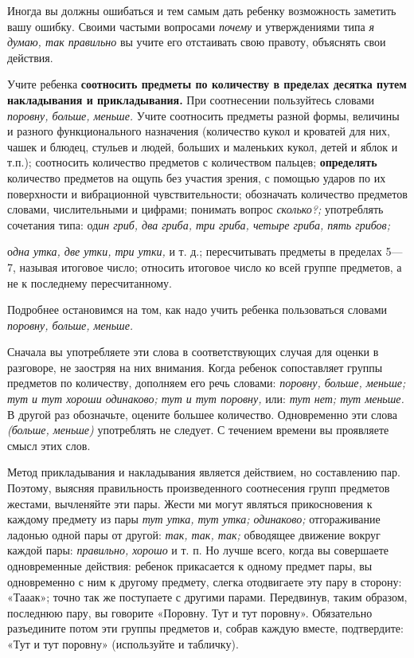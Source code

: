 \documentclass[a5paper]{book}
\renewcommand{\emph}[1]{\textit{#1}}
\begin{document}
Иногда вы должны ошибаться и тем самым дать ребенку возможность заметить
вашу ошибку. Своими частыми вопросами \emph{почему} и утверждениями типа
\emph{я думаю, так правильно} вы учите его отстаивать свою правоту,
объяснять свои действия.

Учите ребенка \textbf{соотносить предметы по количеству в пределах
десятка путем накладывания и прикладывания.} При соотнесении пользуйтесь
словами \emph{поровну, больше, меньше.} Учите соотносить предметы разной
формы, величины и разного функционального назначения (количество кукол и
кроватей для них, чашек и блюдец, стульев и людей, больших и маленьких
кукол, детей и яблок и т.п.); соотносить количество предметов с
количеством пальцев; \textbf{определять} количество предметов на ощупь
без участия зрения, с помощью ударов по их поверхности и вибрационной
чувствительности; обозначать количество предметов словами, числительными
и цифрами; понимать вопрос \emph{сколько?;} употреблять сочетания типа:
од\emph{ин гриб, два гриба, три гриба, четыре гриба, пять грибов;}

о\emph{дна утка, две утки, три утки,} и т. д.; пересчитывать предметы в
пределах 5---7, называя итоговое число; относить итоговое число ко всей
группе предметов, а не к последнему пересчитанному.

Подробнее остановимся на том, как надо учить ребенка пользоваться
словами \emph{поровну, больше, меньше.}

Сначала вы употребляете эти слова в соответствующих случая для оценки в
разговоре, не заостряя на них внимания. Когда ребенок сопоставляет
группы предметов по количеству, дополняем его речь словами:
\emph{поровну, больше, меньше; тут и тут хороши одинаково; тут и тут
поровну,} или: \emph{тут нет; тут меньше.} В другой раз обозначьте,
оцените большее количество. Одновременно эти слова \emph{(больше,
меньше)} употреблять не следует. С течением времени вы проявляете смысл
этих слов.

Метод прикладывания и накладывания является действием, но составлению
пар. Поэтому, выясняя правильность произведенного соотнесения групп
предметов жестами, вычленяйте эти пары. Жести ми могут являться
прикосновения к каждому предмету из пары \emph{тут утка, тут утка;
одинаково;} отгораживание ладонью одной пары от другой: \emph{так, так,
так;} обводящее движение вокруг каждой пары: \emph{правильно, хорошо} и
т. п. Но лучше всего, когда вы совершаете одновременные действия:
ребенок прикасается к одному предмет пары, вы одновременно с ним к
другому предмету, слегка отодвигаете эту пару в сторону: «Тааак»; точно
так же поступаете с другими парами. Передвинув, таким образом, последнюю
пару, вы говорите «Поровну. Тут и тут поровну». Обязательно разъедините
потом эти группы предметов и, собрав каждую вместе, подтвердите: «Тут и
тут поровну» (используйте и табличку).
\end{document}
